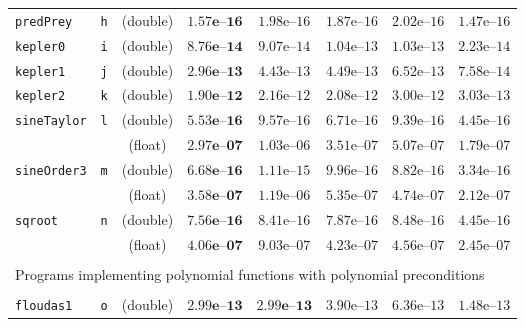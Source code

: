 \begin{tabular}{p{2.3cm}ccccccc}
\multirow{1}{*}{\texttt{predPrey}} & \texttt{h}
& (double) & $\mathbf{1.57\textbf{e--}16}$ & $1.98\text{e--}16$ & $1.87\text{e--}16$ & $2.02\text{e--}16$ & $1.47\text{e--}16$ \\
\multirow{1}{*}{\texttt{kepler0}} & \texttt{i}
& (double) & $\mathbf{8.76\textbf{e--}14}$ & $9.07\text{e--}14$ & $1.04\text{e--}13$ & $1.03\text{e--}13$ & $2.23\text{e--}14$\\
\multirow{1}{*}{\texttt{kepler1}} & \texttt{j}
& (double) & $\mathbf{2.96\textbf{e--}13}$ & $4.43\text{e--}13$ & $4.49\text{e--}13$ & $6.52\text{e--}13$ & $7.58\text{e--}14$\\
\multirow{1}{*}{\texttt{kepler2}} & \texttt{k}
& (double) & $\mathbf{1.90\textbf{e--}12}$ & $2.16\text{e--}12$ & $2.08\text{e--}12$ & $3.00\text{e--}12$ & $3.03\text{e--}13$\\
\hline
\multirow{2}{*}{\texttt{sineTaylor}} & \multirow{2}{*}{\texttt{l}}
& (double) & $\mathbf{5.53\textbf{e--}16}$ & $9.57\text{e--}16$ & $6.71\text{e--}16$ & $9.39\text{e--}16$ & $4.45\text{e--}16$\\
& & (float) & $\mathbf{2.97\textbf{e--}07}$ & $1.03\text{e--}06$ & $3.51\text{e--}07$ & $5.07\text{e--}07$ & $1.79\text{e--}07$\\
\hline 
\multirow{2}{*}{\texttt{sineOrder3}} & \multirow{2}{*}{\texttt{m}}
& (double) & $\mathbf{6.68\textbf{e--}16}$ & $1.11\text{e--}15$ & $9.96\text{e--}16$ & $8.82\text{e--}16$ & $3.34\text{e--}16$\\
& & (float) & $\mathbf{3.58\textbf{e--}07}$ & $1.19\text{e--}06$ & $5.35\text{e--}07$ & $4.74\text{e--}07$ & $2.12\text{e--}07$\\
\hline
\multirow{2}{*}{\texttt{sqroot}} & \multirow{2}{*}{\texttt{n}}
& (double) & $\mathbf{7.56\textbf{e--}16}$ & $8.41\text{e--}16$ & $7.87\text{e--}16$ & $8.48\text{e--}16$ & $4.45\text{e--}16$\\
& & (float) & $\mathbf{4.06\textbf{e--}07}$ & $9.03\text{e--}07$ & $4.23\text{e--}07$ & $4.56\text{e--}07$ & $2.45\text{e--}07$\\
\hline
\\
\multicolumn{8}{l}{Programs implementing polynomial functions with polynomial preconditions}\\
\\
\hline
\multirow{1}{*}{\texttt{floudas1}} & \texttt{o}
& (double) & $\mathbf{2.99\textbf{e--}13}$ & $\mathbf{2.99\textbf{e--}13}$ & $3.90\text{e--}13$ & $6.36\text{e--}13$ & $1.48\text{e--}13$ \\

\end{tabular}
